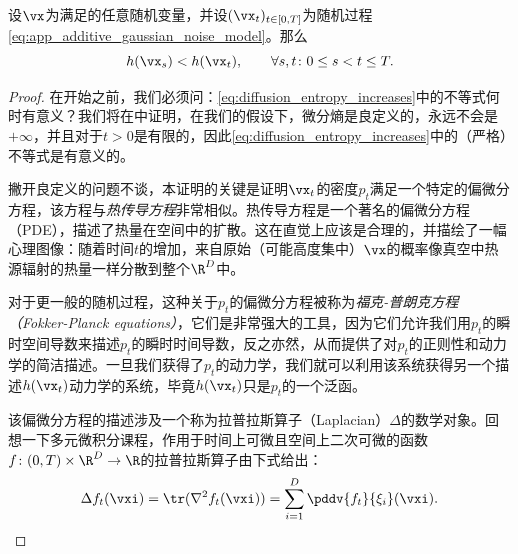 \documentclass[../../book-main_zh.tex]{subfiles}
\begin{document}
\begin{theorem}[扩散增加熵]\label{thm:diffusion_entropy_increases}
    设\(\vx\)为满足的任意随机变量，并设\((\vx_{t})_{t \in [0, T]}\)为随机过程\eqref{eq:app_additive_gaussian_noise_model}。那么
    \begin{equation}\label{eq:diffusion_entropy_increases}
        h(\vx_{s}) < h(\vx_{t}), \qquad \forall s, t \colon 0 \leq s < t \leq T.
    \end{equation}
\end{theorem}
\begin{proof}
    在开始之前，我们必须问：\eqref{eq:diffusion_entropy_increases}中的不等式何时有意义？我们将在中证明，在我们的假设下，微分熵是良定义的，永远不会是\(+\infty\)，并且对于\(t > 0\)是有限的，因此\eqref{eq:diffusion_entropy_increases}中的（严格）不等式是有意义的。

    撇开良定义的问题不谈，本证明的关键是证明\(\vx_{t}\)的密度\(p_{t}\)满足一个特定的偏微分方程，该方程与\textit{热传导方程}非常相似。热传导方程是一个著名的偏微分方程（PDE），描述了热量在空间中的扩散。这在直觉上应该是合理的，并描绘了一幅心理图像：随着时间\(t\)的增加，来自原始（可能高度集中）\(\vx\)的概率像真空中热源辐射的热量一样分散到整个\(\R^{D}\)中。

    对于更一般的随机过程，这种关于\(p_{t}\)的偏微分方程被称为\textit{福克-普朗克方程（Fokker-Planck equations）}，它们是非常强大的工具，因为它们允许我们用\(p_{t}\)的瞬时空间导数来描述\(p_{t}\)的瞬时时间导数，反之亦然，从而提供了对\(p_{t}\)的正则性和动力学的简洁描述。一旦我们获得了\(p_{t}\)的动力学，我们就可以利用该系统获得另一个描述\(h(\vx_{t})\)动力学的系统，毕竟\(h(\vx_{t})\)只是\(p_{t}\)的一个泛函。

    该偏微分方程的描述涉及一个称为拉普拉斯算子（Laplacian）\(\Delta\)的数学对象。回想一下多元微积分课程，作用于时间上可微且空间上二次可微的函数\(f \colon (0, T) \times \R^{D} \to \R\)的拉普拉斯算子由下式给出：
    \begin{equation}
        \Delta f_{t}(\vxi) = \tr(\nabla^{2}f_{t}(\vxi)) = \sum_{i =
        1}^{D}\pddv{f_{t}}{\xi_{i}}(\vxi).
    \end{equation}


\end{proof}
\end{document}
